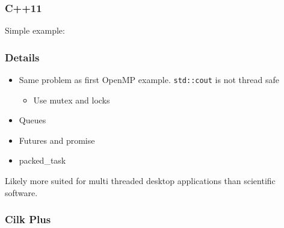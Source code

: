 \subsubsection{C++11}\label{c11}

Simple example:

\begin{Shaded}
\begin{Highlighting}[]

 
\NormalTok{\{}
     
\NormalTok{\}; }

 
\NormalTok{\{}
     
\NormalTok{\}; }


   
\NormalTok{\{}

\NormalTok{\}}
\end{Highlighting}
\end{Shaded}

\subsubsection{Details}\label{details}

\begin{itemize}
\itemsep1pt\parskip0pt
\item
  Same problem as first OpenMP example. \texttt{std::cout} is not thread
  safe

  \begin{itemize}
  \itemsep1pt\parskip0pt
  \item
    Use mutex and locks
  \end{itemize}
\item
  Queues
\item
  Futures and promise
\item
  packed\_task
\end{itemize}

Likely more suited for multi threaded desktop applications than
scientific software.

\subsubsection{Cilk Plus}\label{cilk-plus}

